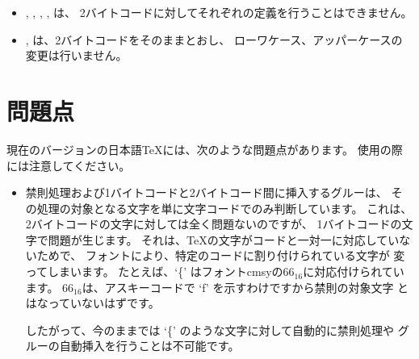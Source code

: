 \begin{itemize}
\item {}, , , ,
	は、
	2バイトコードに対してそれぞれの定義を行うことはできません。
\item {}, は、2バイトコードをそのままとおし、
	ローワケース、アッパーケースの変更は行いません。
\end{itemize}


\section{問題点}
現在のバージョンの日本語\TeX には、次のような問題点があります。
使用の際には注意してください。

\begin{itemize}
\item 禁則処理および1バイトコードと2バイトコード間に挿入するグルーは、
	その処理の対象となる文字を単に文字コードでのみ判断しています。
	これは、2バイトコードの文字に対しては全く問題ないのですが、
	1バイトコードの文字で問題が生じます。
	それは、\TeX の文字がコードと一対一に対応していないためで、
	フォントにより、特定のコードに割り付けられている文字が
	変ってしまいます。
	たとえば、`\{' はフォントcmsyの66$_{16}$に対応付けられています。
	66$_{16}$は、アスキーコードで `f' を示すわけですから禁則の対象文字
	とはなっていないはずです。

	したがって、今のままでは `\{' のような文字に対して自動的に禁則処理や
	グルーの自動挿入を行うことは不可能です。
\end{itemize}

